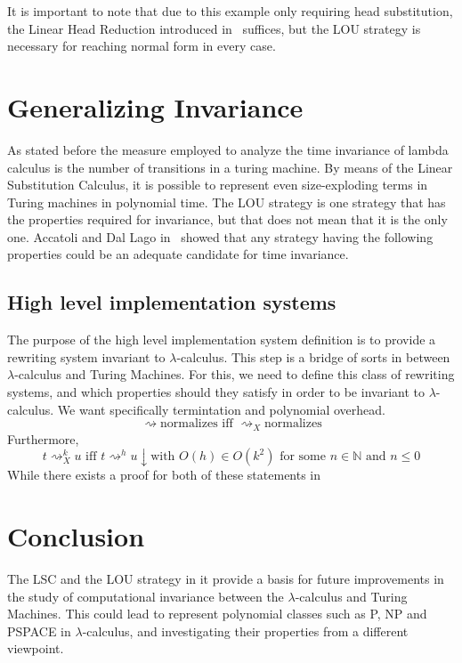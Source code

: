 \documentclass[11pt]{article}
\begin{document}
It is important to note that due to this example only requiring head substitution, the Linear Head Reduction introduced in~\cite{invariance-of-cost-model} suffices, but the LOU strategy is necessary for reaching normal form in every case.

\section{Generalizing Invariance}
As stated before the measure employed to analyze the time invariance of lambda calculus is the number of transitions in a turing machine. By means of the Linear Substitution Calculus, it is possible to represent even size-exploding terms in Turing machines in polynomial time. The LOU strategy is one strategy that has the properties required for invariance, but that does not mean that it is the only one. Accatoli and Dal Lago in~\cite{beta-invariance} showed that any strategy having the following properties could be an adequate candidate for time invariance.
\subsection{High level implementation systems}
The purpose of the high level implementation system definition is to provide a rewriting system invariant to $\lambda$-calculus. This step is a bridge of sorts in between $\lambda$-calculus and Turing Machines. For this, we need to define this class of rewriting systems, and which properties should they satisfy in order to be invariant to $\lambda$-calculus. We want specifically termintation and polynomial overhead.
\[\rightsquigarrow \text{normalizes iff } {\rightsquigarrow}_{X} \text{normalizes}\]
Furthermore,
\[t {\rightsquigarrow}_{X}^k u \text{ iff } t {\rightsquigarrow}^h u\downarrow \text{with } O(h) \in O(k^2) \text{ for some } n \in \mathbb{N} \text{ and } n \leq 0 \]
While there exists a proof for both of these statements in~\cite{beta-invariance}
\section{Conclusion}
The LSC and the LOU strategy in it provide a basis for future improvements in the study of computational invariance between the $\lambda$-calculus and Turing Machines. This could lead to represent polynomial classes such as P, NP and PSPACE in $\lambda$-calculus, and investigating their properties from a different viewpoint.
\printbibliography{}
\end{document}
